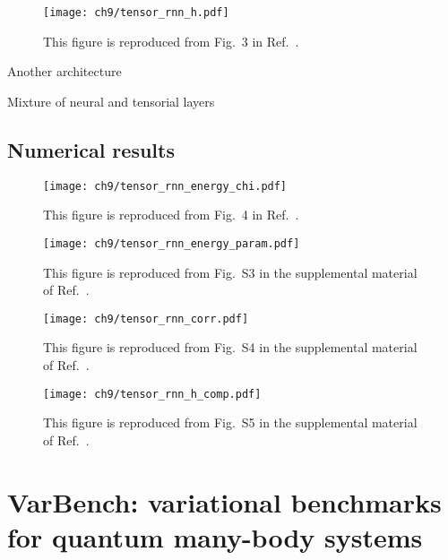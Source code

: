 \begin{figure}[htb]
\centering
\texttt{[image: ch9/tensor\_rnn\_h.pdf]}
\caption[Tensor diagram for memory update of tensor-RNN]{
This figure is reproduced from Fig.~3 in Ref.~\cite{wu2023tensor}.
}
\label{fig:tensor-rnn-h}
\end{figure}

Another architecture~\cite{hibat2021variational, hibat2022supplementing}

Mixture of neural and tensorial layers~\cite{chen2023antn}

\section{Numerical results}

\begin{figure}[htb]
\centering
\hspace*{-0.05\linewidth}
\texttt{[image: ch9/tensor\_rnn\_energy\_chi.pdf]}
\caption[Variational energy vs. bond dimension for tensor-RNN]{
This figure is reproduced from Fig.~4 in Ref.~\cite{wu2023tensor}.
}
\label{fig:tensor-rnn-energy-chi}
\end{figure}

\begin{figure}[htb]
\centering
\hspace*{-0.05\linewidth}
\texttt{[image: ch9/tensor\_rnn\_energy\_param.pdf]}
\caption[Variational energy vs. number of parameters for tensor-RNN]{
This figure is reproduced from Fig.~S3 in the supplemental material of Ref.~\cite{wu2023tensor}.
}
\label{fig:tensor-rnn-energy-param}
\end{figure}

\begin{figure}[htb]
\centering
\hspace*{-0.05\linewidth}
\texttt{[image: ch9/tensor\_rnn\_corr.pdf]}
\caption[Spin correlations in MPS-RNN]{
This figure is reproduced from Fig.~S4 in the supplemental material of Ref.~\cite{wu2023tensor}.
}
\label{fig:tensor-rnn-corr}
\end{figure}

\begin{figure}[htb]
\centering
\texttt{[image: ch9/tensor\_rnn\_h\_comp.pdf]}
\caption[Magnitudes of tensor, matrix, and vector terms in tensor-RNN]{
This figure is reproduced from Fig.~S5 in the supplemental material of Ref.~\cite{wu2023tensor}.
}
\label{fig:tensor-rnn-h-comp}
\end{figure}

\chapter{VarBench: variational benchmarks for quantum many-body systems}
\label{ch:varbench}
